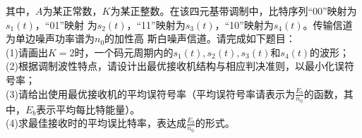 \documentclass[UTF8]{ctexart}
\begin{document}
其中，$A$为某正常数，$K$为某正整数。在该四元基带调制中，比特序列“00”映射为$s_1(t)$，“01”映射
为$s_2(t)$，“11”映射为$s_3(t)$，“10”映射为$s_4(t)$。传输信道为单边噪声功率谱为$n_0$的加性高
斯白噪声信道。请完成如下题目：\\
(1)请画出$K=2$时，一个码元周期内的$s_1(t),s_2(t),s_3(t)$和$s_4(t)$的波形；\\
(2)根据调制波性特点，请设计出最优接收机结构与相应判决准则，以最小化误符号率；\\
(3)请给出使用最优接收机的平均误符号率（平均误符号率请表示为$\frac{E_b}{n_0}$的函数，其中，$E_b
$表示平均每比特能量）。\\
(4)求最佳接收时的平均误比特率，表达成$\frac{E_b}{n_0}$的形式。\\
\end{document}
